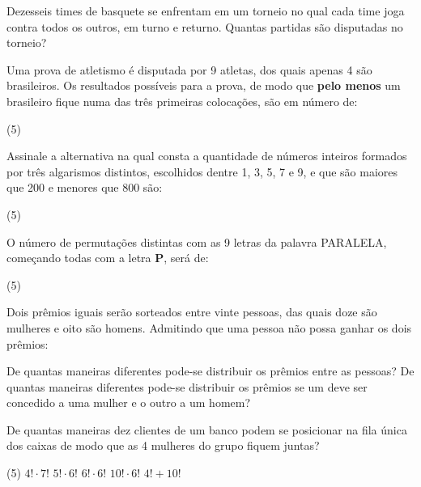 \documentclass[a4paper,11pt,addpoints]{exam}
\begin{document}
\begin{questions}

	\question[1]

    Dezesseis times de basquete se enfrentam em um torneio no qual cada time joga
    contra todos os outros, em turno e returno. Quantas partidas são disputadas
    no torneio?

    \question[1]

    Uma prova de atletismo é disputada por 9 atletas, dos quais apenas 4 são
    brasileiros. Os resultados possíveis para a prova, de modo que \textbf{pelo menos} um
    brasileiro fique numa das três primeiras colocações, são em número de:

    \begin{tasks}(5)
    \end{tasks}

    \question[1]

    Assinale a alternativa na qual consta a quantidade de números inteiros
    formados por três algarismos distintos, escolhidos dentre 1, 3, 5, 7 e 9,
    e que são maiores que 200 e menores que 800 são:

    \begin{tasks}(5)
    \end{tasks}

    \question[1]

    O número de permutações distintas com as 9 letras da palavra PARALELA,
    começando todas com a letra \textbf{P}, será de:

    \begin{tasks}(5)
    \end{tasks}

    \question[1]

    Dois prêmios iguais serão sorteados entre vinte pessoas, das quais doze são
    mulheres e oito são homens. Admitindo que uma pessoa não possa ganhar os
    dois prêmios:

    \begin{tasks}
        \task De quantas maneiras diferentes pode-se distribuir os prêmios entre
        as pessoas?
        \task De quantas maneiras diferentes pode-se distribuir os prêmios
        se um deve ser concedido a uma mulher e o outro a um homem?
    \end{tasks}

    \question[1]

    De quantas maneiras dez clientes de um banco podem se posicionar na fila
    única dos caixas de modo que as 4 mulheres do grupo fiquem juntas?

    \begin{tasks}(5)
        \task $4! \cdot 7!$
        \task $5! \cdot 6!$
        \task $6! \cdot 6!$
        \task $10! \cdot 6!$
        \task $4! + 10!$

    \end{tasks}


\end{questions}
\end{document}
